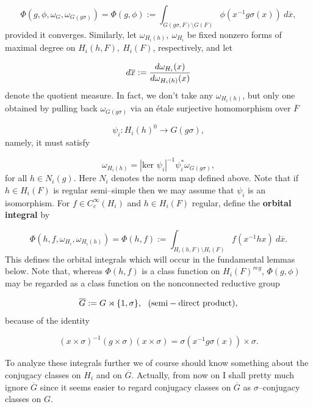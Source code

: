 \documentclass[12pt,letterpaper]{amsart}
\numberwithin{equation}{section}
\theoremstyle{definition}
\theoremstyle{plain}
\def\ovx{\overline{x}}
\begin{document}
\begin{equation}
\label{eqn:1.17}
\Phi (g,\phi ,\omega_G,\omega_{G(g\sigma )}) = \Phi (g,\phi )
:= \int_{G(g\sigma ,F)\setminus G(F)}
\phi (x^{-1}g\sigma (x))\ d\ovx,
\end{equation}
provided it converges.
Similarly, let $\omega_{H_i(h)},\ \omega_{H_i}$ be fixed nonzero 
forms of maximal
degree on $H_i(h,F),\ H_i(F)$, respectively, and let

\[
d\ovx := {d\omega_{H_i}(x)\over{d\omega_{H_i(h)}(x)}}
\]
denote the quotient measure. In fact, we don't take any $\omega_{H_i(h)}$,
but only one obtained by pulling back $\omega_{G(g\sigma)}$ via an \'etale
surjective homomorphism over $\overline{F}$

\[
\psi_i : H_i(h)^0 \rightarrow G(g\sigma ),
\]
namely, it must satisfy

\[
\omega_{H_i(h)}=|\text{ker }\psi_i|^{-1}\psi^*_i\omega_{G(g\sigma )},
\]
for all $h \in N_i(g)$. Here $N_i$ denotes the norm map defined above. 
Note that if $h \in H_i(F)$ is regular semi--simple then we may assume that
$\psi_i$ is an isomorphism. For $f \in C^\infty_c(H_i)$ and $h \in H_i(F)$
regular, define the {\bf orbital integral} by

\begin{equation}
\label{eqn:1.18}
\Phi (h,f,\omega_{H_i},\omega_{H_i(h)}) = 
\Phi (h,f):= \int_{H_i(h,F)\setminus H_i(F)}
f(x^{-1}hx)\ d\ovx .
\end{equation} 
This defines the orbital integrals which will
occur in the fundamental lemmas below. Note that, whereas 
$\Phi (h,f)$ is a class function on $H_i(F)^{reg}$, $\Phi (g,\phi )$
may be regarded as a class function on the nonconnected reductive group

\[
\overline{G} := G \rtimes \{1,\sigma \},\ \ {\rm (semi-direct\ product)},
\]
because of the identity

\[
(x\times \sigma )^{-1}(g\times \sigma )(x\times \sigma )
=\sigma (x^{-1}g\sigma (x))\times \sigma .
\]
 
To analyze these integrals further we of course should know something
about the conjugacy classes on $H_i$ and on $\overline{G}$. Actually,
from now on I shall pretty much ignore $\overline{G}$ since it
seems easier to regard conjugacy classes on
$\overline{G}$ as $\sigma$--conjugacy classes on $G$. 
 
\end{document}
